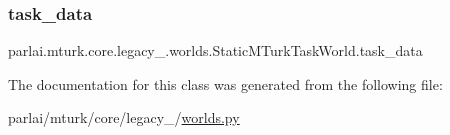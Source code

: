 \subsubsection{\texorpdfstring{task\+\_\+data}{task\_data}}
{\footnotesize\ttfamily parlai.\+mturk.\+core.\+legacy\+\_.\+worlds.\+Static\+M\+Turk\+Task\+World.\+task\+\_\+data}



The documentation for this class was generated from the following file\+:\begin{DoxyCompactItemize}
\item 
parlai/mturk/core/legacy\+\_/\hyperlink{parlai_2mturk_2core_2legacy__2018_2worlds_8py}{worlds.\+py}\end{DoxyCompactItemize}
